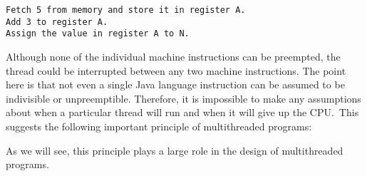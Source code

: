 \begin{jjjlisting}
\begin{lstlisting}
Fetch 5 from memory and store it in register A.
Add 3 to register A.
Assign the value in register A to N.
\end{lstlisting}
\end{jjjlisting}

\noindent Although none of the individual machine instructions can
be preempted, the thread could be interrupted between any two machine
instructions.  The point here is that not even a single Java language
instruction can be assumed to be indivisible or unpreemptible.
Therefore, it is impossible to make any assumptions about when a
particular thread will run and when it will give up the CPU.~This
suggests the following important principle of multithreaded programs:



\noindent As we will see, this principle plays a large role
in the design of multithreaded programs.

\begin{figure}[b]
\end{figure}

